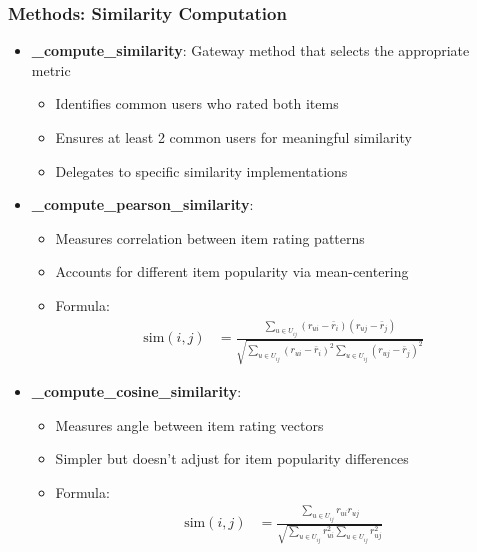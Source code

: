 \documentclass{beamer}
\begin{document}
\begin{frame}
\frametitle{Methods: Similarity Computation}

\begin{itemize}
    \item \textbf{\_compute\_similarity}: Gateway method that selects the appropriate metric
    \begin{itemize}
        \item Identifies common users who rated both items
        \item Ensures at least 2 common users for meaningful similarity
        \item Delegates to specific similarity implementations
    \end{itemize}
    
    \item \textbf{\_compute\_pearson\_similarity}:
    \begin{itemize}
        \item Measures correlation between item rating patterns
        \item Accounts for different item popularity via mean-centering
        \item Formula: 
        \begin{align*}
        \text{sim}(i,j) &= \frac{\sum_{u \in U_{ij}}(r_{ui}-\bar{r}_i)(r_{uj}-\bar{r}_j)}{\sqrt{\sum_{u \in U_{ij}}(r_{ui}-\bar{r}_i)^2 \sum_{u \in U_{ij}}(r_{uj}-\bar{r}_j)^2}}
        \end{align*}
    \end{itemize}
    
    \item \textbf{\_compute\_cosine\_similarity}:
    \begin{itemize}
        \item Measures angle between item rating vectors
        \item Simpler but doesn't adjust for item popularity differences
        \item Formula: 
        \begin{align*}
        \text{sim}(i,j) &= \frac{\sum_{u \in U_{ij}}r_{ui}r_{uj}}{\sqrt{\sum_{u \in U_{ij}}r_{ui}^2 \sum_{u \in U_{ij}}r_{uj}^2}}
        \end{align*}
    \end{itemize}
\end{itemize}
\end{frame}
\end{document}
